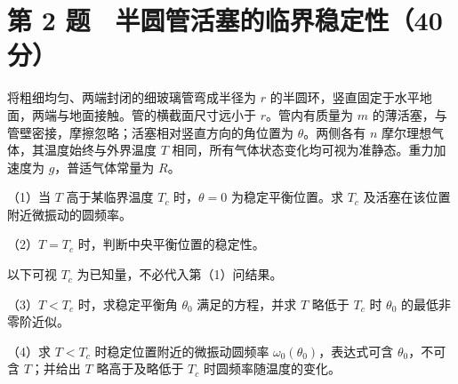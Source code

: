 \documentclass[12pt,a4paper,fontset=fandol]{ctexart}
\begin{document}
\clearpage

\section{第 2
题　半圆管活塞的临界稳定性（40分）}\label{ux7b2c-2-ux9898-ux534aux5706ux7ba1ux6d3bux585eux7684ux4e34ux754cux7a33ux5b9aux602740ux5206}

将粗细均匀、两端封闭的细玻璃管弯成半径为 \(r\)
的半圆环，竖直固定于水平地面，两端与地面接触。管的横截面尺寸远小于
\(r\)。管内有质量为 \(m\)
的薄活塞，与管壁密接，摩擦忽略；活塞相对竖直方向的角位置为
\(\theta\)。两侧各有 \(n\) 摩尔理想气体，其温度始终与外界温度 \(T\)
相同，所有气体状态变化均可视为准静态。重力加速度为 \(g\)，普适气体常量为
\(R\)。

\begin{center}
\begin{minipage}{\linewidth}
\centering\begingroup{}
\ifdim\wd\diagrambox>.88\linewidth
\sbox{\diagrambox}{\resizebox{.88\linewidth}{!}{\usebox{\diagrambox}}}\fi
\ifdim\ht\diagrambox>.38\textheight
\resizebox{!}{.38\textheight}{\usebox{\diagrambox}}
\else\usebox{\diagrambox}\fi
\par{}\endgroup\end{minipage}\end{center}

（1）当 \(T\) 高于某临界温度 \(T_c\) 时，\(\theta=0\) 为稳定平衡位置。求
\(T_c\) 及活塞在该位置附近微振动的圆频率。

（2）\(T=T_c\) 时，判断中央平衡位置的稳定性。

以下可视 \(T_c\) 为已知量，不必代入第（1）问结果。

（3）\(T<T_c\) 时，求稳定平衡角 \(\theta_0\) 满足的方程，并求 \(T\)
略低于 \(T_c\) 时 \(\theta_0\) 的最低非零阶近似。

（4）求 \(T<T_c\) 时稳定位置附近的微振动圆频率
\(\omega_0(\theta_0)\)，表达式可含 \(\theta_0\)，不可含 \(T\)；并给出
\(T\) 略高于及略低于 \(T_c\) 时圆频率随温度的变化。
\end{document}
